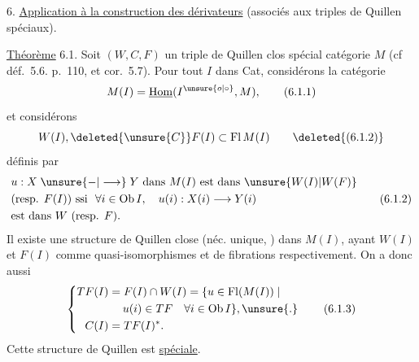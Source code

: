 
6. \uline{Application à la construction des dérivateurs}
(associés aux triples de Quillen spéciaux).

\uline{Théorème} 6.1. Soit  $(W,C,F)$ un triple
de Quillen clos spécial   catégorie $M$
(cf déf.~5.6. p.~110, et cor.~5.7). Pour
tout $I$ dans Cat, considérons la catégorie
\[
 M(I)=\underline{\mathrm{Hom}}(I^{\unsure{o|\circ}},M),\tag*{(6.1.1)}
\]
et  considérons
\[
 W(I),\deleted{\unsure{C}}F(I)\subset\mathrm{Fl}\,M(I)\tag*{\deleted{(6.1.2)}}
\]
définis par
\[
\begin{aligned}
 &u:X\mathrel{\unsure{-|\longrightarrow}}Y\ \text{dans }M(I)\text{ est dans }\unsure{W(I)|W(F)}\\
 &\text{(resp. }F(I))\ \text{ssi }\ \forall i\in\mathrm{Ob}\,I,\quad u(i):X(i)\longrightarrow Y(i)\\
 &\text{est dans }W\ \text{(resp. }F).
\end{aligned}\tag*{(6.1.2)}
\]
  Il existe une structure de
Quillen close (néc. unique, ) dans $M(I)$,
ayant $W(I)$ et $F(I)$ comme  
quasi-isomorphismes et de fibrations
respectivement. On a donc aussi
\[
\left\{\begin{aligned}
 TF(I)&=F(I)\cap W(I)=\{u\in\mathrm{Fl}(M(I))\mid\\
 &\hspace{1.25em}u(i)\in TF\quad\forall i\in\mathrm{Ob}\,I\},\unsure{.}\\
 C(I)&=TF(I)^{*}.
\end{aligned}\right.\tag*{(6.1.3)}
\]
Cette structure de Quillen est \uline{spéciale}.

